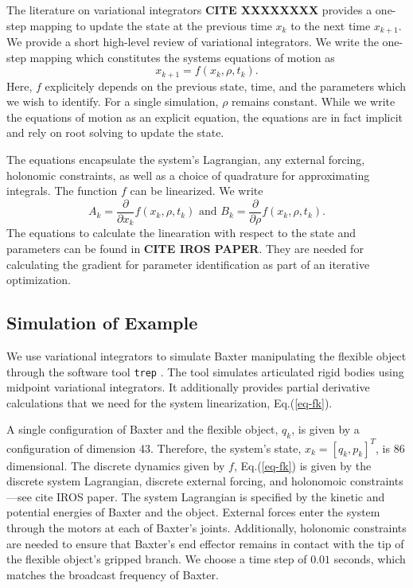 \documentclass[runningheads,a4paper]{llncs}
\begin{document}
The literature on variational integrators \textbf{CITE XXXXXXXX} provides a one-step mapping to update the state at the previous time $x_k$ to the next time $x_{k+1}$.  We provide a short high-level review of variational integrators.  We write the one-step mapping which constitutes the systems equations of motion as 
\begin{equation}
x_{k+1} = f(x_k,\rho,t_k).
\label{eq-fk}
\end{equation}
Here, $f$ explicitely depends on the previous state, time, and the parameters which we wish to identify. For a single simulation, $\rho$ remains constant.  While we write the equations of motion as an explicit equation, the equations are in fact implicit and rely on root solving to update the state. 

The equations encapsulate the system's Lagrangian, any external forcing, holonomic constraints, as well as a choice of quadrature for approximating integrals.  The function $f$ can be linearized. We write 
\begin{equation}
A_k = \frac{\partial}{\partial x_k}f(x_k,\rho,t_k) \textrm{ and } B_k = \frac{\partial}{\partial \rho}f(x_k,\rho,t_k).
\label{eq-lin_fk}
\end{equation}
The equations to calculate the linearation with respect to the state and parameters can be found in \textbf{CITE IROS PAPER}. They are needed for calculating the gradient for parameter identification as part of an iterative optimization.

\subsection{Simulation of Example}
We use variational integrators to simulate Baxter manipulating the flexible object through the software tool \texttt{trep} \cite{johnson_murphey_scalable}.  The tool simulates articulated rigid bodies using midpoint variational integrators.  It additionally provides partial derivative calculations that we need for the system linearization, Eq.(\ref{eq-fk}). 

A single configuration of Baxter and the flexible object, $q_k$, is given by a configuration of dimension 43. Therefore, the system's state,  $x_k = [q_k,p_k]^T$, is 86 dimensional. The discrete dynamics given by $f$, Eq.(\ref{eq-fk}) is given by the discrete system Lagrangian, discrete external forcing, and holonomoic constraints---see cite IROS paper.  The system Lagrangian is specified by the kinetic and potential energies of Baxter and the object.  External forces enter the system through the motors at each of Baxter's joints.  Additionally, holonomic constraints are needed to ensure that Baxter's end effector remains in contact with the tip of the flexible object's gripped branch.  We choose a time step of $0.01$ seconds, which matches the broadcast frequency of Baxter. 
\end{document}

